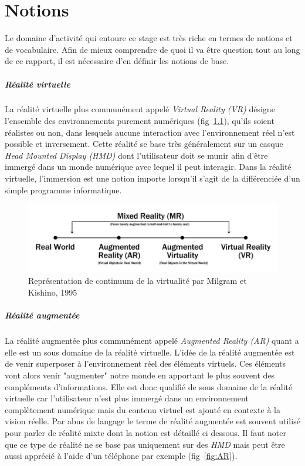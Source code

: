 \newpage
\chapter{Notions}
\label{chap:notions}

Le domaine d'activité qui entoure ce stage est très riche en termes de notions et de vocabulaire. Afin de mieux comprendre de quoi il va être question tout au long de ce rapport, il est nécessaire d'en définir les notions de base.

\paragraph{Réalité virtuelle}
La réalité virtuelle plus communément appelé \emph{Virtual Reality (VR)} désigne l'ensemble des environnements purement numériques (fig~\ref{fig:realityspectrum}), qu'ils soient réalistes ou non, dans lesquels aucune interaction avec l'environnement réel n'est possible et inversement. Cette réalité se base très généralement sur un casque \emph{Head Mounted Display (HMD)} dont l'utilisateur doit se munir afin d'être immergé dans un monde numérique avec lequel il peut interagir. Dans la réalité virtuelle, l'immersion est une notion importe lorsqu'il s'agit de la différenciée d'un simple programme informatique.

\begin{figure}[h]
\centering
\includegraphics[scale=1]{images/RealitySpectrum}
\caption{Représentation de continuum de la virtualité par Milgram et Kishino, 1995\cite{milgram1995augmented}}
\label{fig:realityspectrum}
\end{figure}

\paragraph{Réalité augmentée}
La réalité augmentée plus communément appelé \emph{Augmented Reality (AR)} quant a elle est un sous domaine de la réalité virtuelle. L'idée de la réalité augmentée est de venir superposer à l'environnement réel des éléments virtuels. Ces éléments vont alors venir "augmenter" notre monde en apportant le plus souvent des compléments d'informations. Elle est donc qualifié de sous domaine de la réalité virtuelle car l'utilisateur n'est plus immergé dans un environnement complètement numérique mais du contenu virtuel est ajouté en contexte à la vision réelle. Par abus de langage le terme de réalité augmentée est souvent utilisé pour parler de réalité mixte dont la notion est détaillé ci dessous.
Il faut noter que ce type de réalité ne se base pas uniquement sur des \emph{HMD} mais peut être aussi apprécié à l'aide d'un téléphone par exemple (fig~\ref{fig:AR}).

